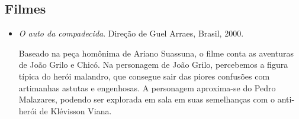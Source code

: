 \documentclass[11pt]{extarticle}
\begin{document}
\subsection{Filmes}

\begin{itemize}
\item \textit{O auto da compadecida}. Direção de Guel Arraes, Brasil, 2000.

Baseado na peça homônima de Ariano Suassuna, o filme conta as aventuras de João Grilo e Chicó. Na personagem de João Grilo, percebemos a figura típica do herói malandro, que consegue sair das piores confusões com artimanhas astutas e engenhosas. A personagem aproxima-se do Pedro Malazares, podendo ser explorada em sala em suas semelhanças com o anti-herói de Klévisson Viana.
\end{itemize}
\end{document}
